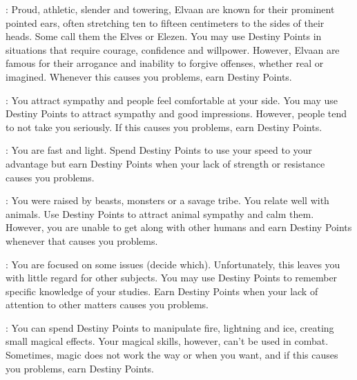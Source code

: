 \begin{multicols}{2}
\noindent{}
\begin{minipage}{.35\textwidth-2\columnsep}
: Proud, athletic, slender and towering, Elvaan are known for their prominent pointed ears, often stretching ten to fifteen centimeters to the sides of their heads. Some call them the Elves or Elezen. You may use Destiny Points in situations that require courage, confidence and willpower. However, Elvaan are famous for their arrogance and inability to forgive offenses, whether real or imagined. Whenever this causes you problems, earn Destiny Points.
\end{minipage} \pw

\begin{ffcolpage}
: You attract sympathy and people feel comfortable at your side. You may use Destiny Points to attract sympathy and good impressions. However, people tend to not take you seriously. If this causes you problems, earn Destiny Points.
\end{ffcolpage} \pw

\begin{ffcolpage}
: You are fast and light. Spend Destiny Points to use your speed to your advantage but earn Destiny Points when your lack of strength or resistance causes you problems.
\end{ffcolpage} \pw

\begin{ffcolpage}
: You were raised by beasts, monsters or a savage tribe. You relate well with animals. Use Destiny Points to attract animal sympathy and calm them. However, you are unable to get along with other humans and earn Destiny Points whenever that causes you problems.
\end{ffcolpage} \pw

\begin{ffcolpage}
: You are focused on some issues (decide which). Unfortunately, this leaves you with little regard for other subjects. You may use Destiny Points to remember specific knowledge of your studies. Earn Destiny Points when your lack of attention to other matters causes you problems.
\end{ffcolpage} \pw

\begin{ffcolpage}
: You can spend Destiny Points to manipulate fire, lightning and ice, creating small magical effects. Your magical skills, however, can’t be used in combat. Sometimes, magic does not work the way or when you want, and if this causes you problems, earn Destiny Points.
\end{ffcolpage} \pw


\end{multicols}
